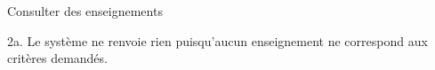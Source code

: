 \begin{ocl}
\begin{usecase}{Consulter des enseignements}
 \begin{extension}
 \item [2a.] Le système ne renvoie rien puisqu'aucun enseignement ne correspond aux critères demandés.
 \end{extension}
\end{usecase}


\begin{comment}
 \subsection{Instantanés et contraintes OCL sur les cas d'utilisation}
 \indent Nous allons vous présenter, dans cette sous-partie, un ensemble représentatif d'instantanés des cas d'utilisation. Nous allons donc partir d'un système vide (seul le département est représenté avec un module et deux enseignements) pour ensuite illustrer l'évolution de notre système au cours de son utilisation.\\
 \indent Voici le diagramme d'instances qui va nous servir de point de départ pour nos instantanés (nous considérons comme triviale la création des modules et des enseignements associés à un département) :

 \begin{figure}[!htbp]
 \begin{center}
 \texttt{[image: fig/base.jpg]}
 \caption{Instantané de départ}
 \end{center}
 \end{figure}

 \subsubsection{Assigner un enseignant à un département}
 \indent Cas d'utilisation : non mentionné car basique - Acteur : \textbf{Chef de département}.

 \begin{figure}[!htbp]
 \begin{center}
 \texttt{[image: fig/1-assignEnseignant.jpg]}
 \caption{Assignation d'un enseignant}
 \end{center}
 \end{figure}

 \indent L'assignation d'un nouvel enseignant au département provoque l'ajout d'une instance de la classe \textbf{Enseignant} ainsi que du contrat de service qui lui est associé (instance de la classe \textbf{ContratDeService}).

 \begin{verbatim}
 context Departement::assignerEnseignant(e : Enseignant)
 post : self.enseignant.include(e)
        and not e.contratdeservice.isUndefined()
 \end{verbatim}
 \emph{L'enseignant appartient au département et possède un contrat de service unique. L'assignation provient du chef de département.}








\end{comment}
\end{ocl}

